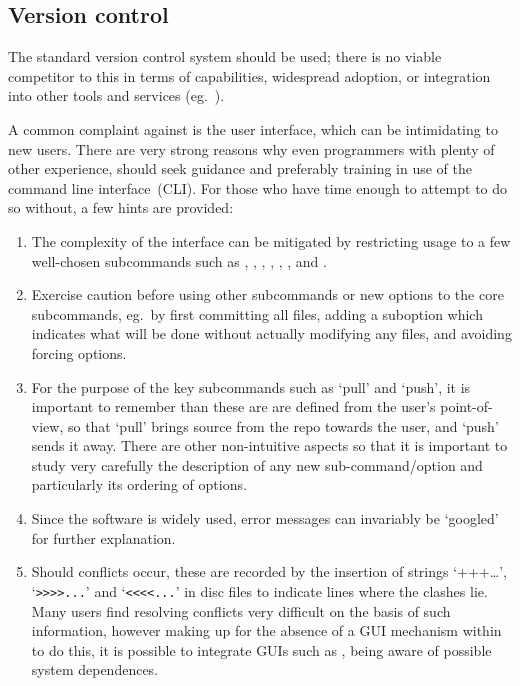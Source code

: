 \subsection{Version control} \label{sec:version}

The standard  version control system should be used; there is no
viable competitor to this in terms of capabilities, widespread adoption,
or integration into other tools and services (eg.\ ).

A common complaint against  is the user interface, which can be intimidating 
to new users. There are very strong reasons why even programmers with
plenty of other experience, should seek guidance and preferably training
in use of the command line interface~(CLI). For those who have time enough to attempt to do so without, 
a few hints are provided: 
\begin{enumerate}
\item The complexity of the interface can be mitigated by restricting usage
to a few well-chosen subcommands such as , , , , , ,  and .
\item  Exercise caution before using other
subcommands or new options to the core subcommands, eg.\  by first committing all files, adding a suboption
which indicates what will be done without actually modifying any files, and avoiding 
forcing options.
\item For the purpose of the key subcommands such as `pull' and `push', it is important
to remember than these are are defined from the user's point-of-view,
so that `pull' brings source from the repo towards the user, and `push' sends it away.
There are other non-intuitive aspects so that it is important to study very carefully the
description of any new sub-command/option and particularly its ordering of options.
\item Since the software is widely used, error messages can invariably be `googled'
for further explanation.
\item Should conflicts occur, these are recorded by the insertion of strings `+++\ldots',
`\verb->>>>...-' and `\verb-<<<<...-' in disc files to indicate lines where the clashes lie. Many users
find resolving conflicts very difficult on the basis of such information,
however making up for  the absence of a GUI mechanism within  to do this,
it is possible to integrate GUIs such as , being aware of possible system dependences.
\end{enumerate}


